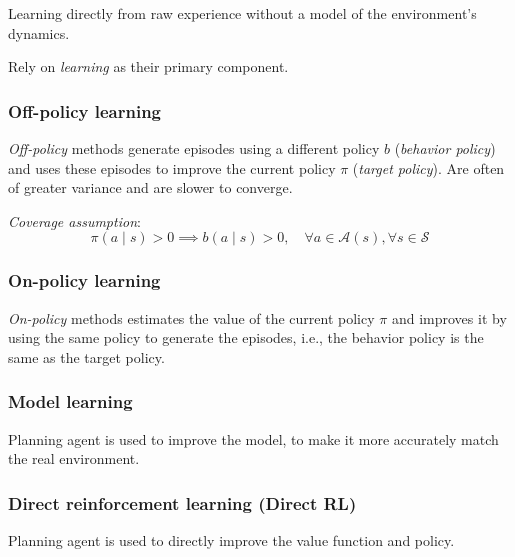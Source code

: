Learning directly from raw experience without a model of the environment’s dynamics.

Rely on \textit{learning} as their primary component.

\subsubsection{Off-policy learning}

\textit{Off-policy} methods generate episodes using a different policy \( b \) (\textit{behavior policy}) and uses these episodes to improve the current policy \( \pi \) (\textit{target policy}).
Are often of greater variance and are slower to converge.

\textit{Coverage assumption}:
\begin{equation}
    \pi(a \mid s) > 0 \implies b(a \mid s) > 0, \quad \forall a \in \mathcal{A}(s), \forall s \in \mathcal{S}
\end{equation}

\subsubsection{On-policy learning}

\textit{On-policy} methods estimates the value of the current policy \( \pi \) and improves it by using the same policy to generate the episodes, i.e., the behavior policy is the same as the target policy.

\subsubsection{Model learning}

Planning agent is used to improve the model, to make it more accurately match the real environment.

\subsubsection{Direct reinforcement learning (Direct RL)}

Planning agent is used to directly improve the value function and policy.
